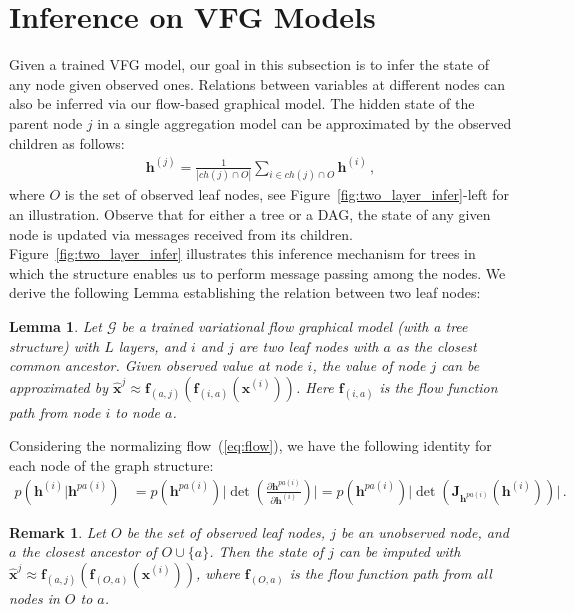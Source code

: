 \documentclass{article}
\newtheorem{lemma}{Lemma}
\newtheorem{remark}{Remark}
\begin{document}
\section{Inference on VFG Models }\label{sec:infer}
Given a trained VFG model, our goal in this subsection is to infer the state of any node given observed ones. 
Relations between variables at different nodes can also be inferred via our flow-based graphical model. 
The hidden state of the parent node $j$ in a single aggregation model can be approximated by the observed children as follows:
 \begin{align}\label{eq:aggr_obs_ch}
\mathbf{h}^{(j)}  = \frac{1}{|ch(j) \cap O|}\sum_{i \in ch(j) \cap O} \mathbf{h}^{(i)} \, ,
\end{align}%
where $O$ is the set of observed leaf nodes, see Figure~\ref{fig:two_layer_infer}-left for an illustration. 
Observe that for either a tree or a DAG, the state of any given node is updated via messages received from its children. Figure~\ref{fig:two_layer_infer} illustrates this inference mechanism for trees in which the structure enables us to perform message passing among the nodes. 
We derive the following Lemma establishing the relation between two leaf nodes:
\begin{lemma}\label{lm:apprx}
Let $\mathcal{G}$ be a trained variational flow graphical model (with a tree structure) with $L$ layers, and $i$ and $j$ are two leaf nodes with $a$ as the closest common ancestor. Given observed value at node $i$, the value of node $j$ can be approximated by   $\widehat{\mathbf{x}}^{j} \approx  \mathbf{f}_{(a,j)}(\mathbf{f}_{(i, a)}(\mathbf{x}^{(i)}))$. Here $\mathbf{f}_{(i, a)}$ is the flow function path from node $i$ to node $a$. 
\end{lemma}
Considering the normalizing flow~(\ref{eq:flow}), we have the following identity for each node of the graph structure:
\begin{align*}
p(\mathbf{h}^{(i)} | \mathbf{h}^{pa(i)}) & = p(\mathbf{h}^{pa(i)}) \big|\det(\frac{\partial \mathbf{h}^{pa(i)} }{\partial \mathbf{h}^{(i)}})\big|   =
p(\mathbf{h}^{pa(i)}) \big|\det(\mathbf{J}_{\mathbf{h}^{pa(i)}}(\mathbf{h}^{(i)}))\big| \, .
\end{align*}
\begin{remark}\label{rmk:apprx_mul}
Let $O$ be the set of observed leaf nodes, $j$ be an unobserved node, and $a$ the closest ancestor of $O \cup \{a\}$. 
Then the state of $j$ can be imputed with $\widehat{\mathbf{x}}^{j} \approx  \mathbf{f}_{(a,j)}(\mathbf{f}_{(O, a)}(\mathbf{x}^{(i)}))$, where $\mathbf{f}_{(O, a)}$ is the flow function path from all nodes in $O$ to $a$.
\end{remark}
\vspace{-0.1in}
\end{document}
